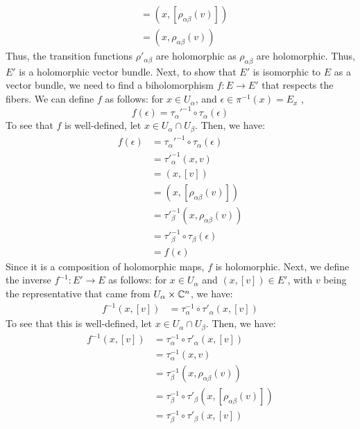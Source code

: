 \documentclass[12pt]{article}
\begin{document}
\begin{solu}
\begin{enumerate}
\begin{align*}
            &= (x, [\rho_{\alpha\beta}(v)])  \\
            &= (x, \rho_{\alpha\beta}(v))         
        \end{align*}
        Thus, the transition functions $\rho'_{\alpha\beta}$ are holomorphic as $\rho_{\alpha\beta}$ are holomorphic. Thus, $E'$ is a holomorphic vector bundle. \bbni
        Next, to show that $E'$ is isomorphic to $E$ as a vector bundle, we need to find a biholomorphism $f: E \to E'$ that respects the fibers. We can define $f$ as follows: for $x \in U_\alpha$, and $\epsilon \in \pi^{-1}(x) = E_x$ , 
        \[ f(\epsilon) = \tau_\alpha'^{-1} \circ \tau_\alpha(\epsilon)\]
        To see that $f$ is well-defined, let $x \in U_\alpha \cap U_\beta$. Then, we have: 
        \begin{align*}
            f(\epsilon) &= \tau_\alpha'^{-1} \circ \tau_\alpha(\epsilon) \\
            &= \tau'^{-1}_\alpha(x, v) \\
            &= (x, [v]) \\
            &= (x, [\rho_{\alpha\beta}(v)]) \\
            &= \tau'^{-1}_\beta(x, \rho_{\alpha\beta}(v)) \\
            &= \tau'^{-1}_\beta \circ \tau_{\beta}(\epsilon) \\
            &= f(\epsilon)
        \end{align*}
        Since it is a composition of holomorphic maps, $f$ is holomorphic. Next, we define the inverse $f^{-1}: E' \to E$ as follows: for $x \in U_\alpha$ and $(x, [v]) \in E'$, with $v$ being the representative that came from $U_\alpha \times \mathbb C^n$, we have: 
        \begin{align*}
            f^{-1}(x, [v]) &= \tau^{-1}_\alpha \circ \tau'_\alpha(x, [v]) 
        \end{align*}
        To see that this is well-defined, let $x \in U_\alpha \cap U_\beta$. Then, we have:
        \begin{align*}
            f^{-1}(x, [v]) &= \tau^{-1}_\alpha \circ \tau'_\alpha(x, [v]) \\
            &= \tau^{-1}_\alpha(x, v) \\
            &= \tau_\beta^{-1}(x, \rho_{\alpha\beta}(v)) \\
            &= \tau_\beta^{-1} \circ \tau'_\beta(x, [\rho_{\alpha\beta}(v)]) \\
            &= \tau_\beta^{-1} \circ \tau'_\beta(x, [v]) \\

\end{align*}
\end{enumerate}
\end{solu}
\end{document}
